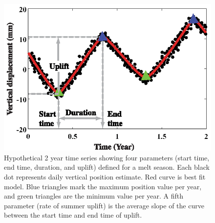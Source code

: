 \clearpage
\begin{figure}
 \centering
 \includegraphics{figs_chpt3/2012GC004432-p02.eps} 
 \caption[Hypothetical 2 year time series showing four parameters (start time, end time, duration, and uplift) defined for a melt season.]{Hypothetical 2 year time series showing four parameters (start time, end time, duration, and uplift) defined for a melt season. Each black dot represents daily vertical position estimate. Red curve is best fit model. Blue triangles mark the maximum position value per year, and green triangles are the minimum value per year. A fifth parameter (rate of summer uplift) is the average slope of the curve between the start time and end time of uplift.}
 \label{fig:fig2}
\end{figure}

